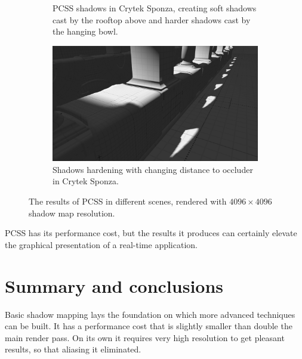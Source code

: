 \begin{figure}[h]
\begin{subfigure}[t]{0.49\textwidth}
        \caption{PCSS shadows in Crytek Sponza, creating soft shadows cast by the rooftop above and harder shadows cast by the hanging bowl.}
    \end{subfigure}
	\hfill
    \begin{subfigure}[t]{0.49\textwidth}
		\centering
        \includegraphics[width=\textwidth]{./graf/tests/pcss/cropped/sponza_pcss_2.png}
        \caption{Shadows hardening with changing distance to occluder in Crytek Sponza.}
    \end{subfigure}

    \caption{The results of PCSS in different scenes, rendered with \(4096\times 4096\) shadow map resolution.}
    \label{fig:test_pcss_screens}
\end{figure}

PCSS has its performance cost, but the results it produces can certainly elevate the graphical presentation of a real-time application.

\section{Summary and conclusions}

Basic shadow mapping lays the foundation on which more advanced techniques can be built. It has a performance cost that is slightly smaller than double the main render pass. On its own it requires very high resolution to get pleasant results, so that aliasing it eliminated.

